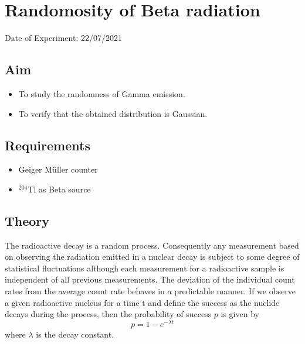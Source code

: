 


	
	\chapter{Randomosity of Beta radiation } %
	\vspace{-1cm}
	
	\begin{center}%
		Date of Experiment: 22/07/2021
	\end{center}
	
	
	\section{Aim}
	\begin{itemize}
		\item To study the randomness of Gamma emission.
		\item To verify that the obtained distribution is Gaussian.
	\end{itemize}
	
	\section{Requirements}
	\begin{itemize}
		\item 	Geiger M{\"u}ller counter
		\item 	$ ^{204} $Tl as Beta source
	\end{itemize}
	
	\section{Theory}
	The radioactive decay is a random process. Consequently any measurement based on observing the radiation emitted in a nuclear decay is subject to some degree of statistical fluctuations although each measurement for a radioactive sample is independent of all previous measurements. The deviation of the individual count rates from the average count rate behaves in a predictable manner. If we observe a given radioactive nucleus for a time t and define the success as the nuclide decays during the process, then the probability of success $ p $ is given by 
	\begin{equation} 
		p = 1-e^{-\lambda t}
	\end{equation}  where $\lambda$ is the decay constant. \\
	
